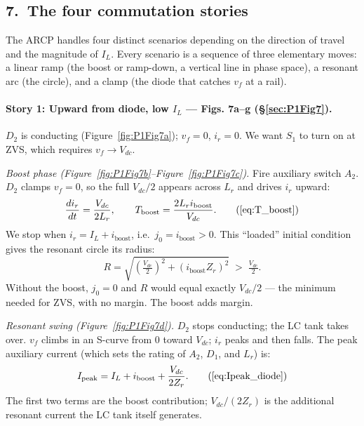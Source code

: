 \documentclass[12pt, a4paper]{article}
\def\,{ }%
\newcommand{\Vdc}{V_{dc}}
\newcommand{\vf}{v_f}
\newcommand{\ir}{i_r}
\newcommand{\IL}{I_L}
\newcommand{\Lr}{L_r}
\newcommand{\Zr}{Z_r}
\newcommand{\figref}[1]{Figure~\ref{#1}}
\begin{document}
\subsection*{7.\ The four commutation stories}

The ARCP handles four distinct scenarios depending on the direction of travel
and the magnitude of $\IL$.
Every scenario is a sequence of three elementary moves: a linear ramp (the
boost or ramp-down, a vertical line in phase space), a resonant arc (the
circle), and a clamp (the diode that catches $\vf$ at a rail).

%
\paragraph{Story 1: Upward from diode, low $\IL$ --- Figs.\,7a--g
           (\S\ref{sec:P1Fig7}).}

$D_2$ is conducting (\figref{fig:P1Fig7a}); $\vf = 0$, $\ir = 0$.
We want $S_1$ to turn on at ZVS, which requires $\vf \to \Vdc$.

\medskip\noindent
\textit{Boost phase (\figref{fig:P1Fig7b}--\figref{fig:P1Fig7c}).}
Fire auxiliary switch $A_2$.
$D_2$ clamps $\vf = 0$, so the full $\Vdc/2$ appears across $\Lr$ and drives
$\ir$ upward:
\begin{equation}
    \frac{d\ir}{dt} = \frac{\Vdc}{2\Lr},
    \qquad
    T_\text{boost} = \frac{2\Lr\,i_\text{boost}}{\Vdc}.
    \tag{\ref{eq:T_boost}}
\end{equation}
We stop when $\ir = \IL + i_\text{boost}$, i.e.\ $j_0 = i_\text{boost} > 0$.
This ``loaded'' initial condition gives the resonant circle its radius:
\[
    R = \sqrt{\!\left(\tfrac{\Vdc}{2}\right)^{\!2} + (i_\text{boost}\Zr)^2}
    \;>\; \tfrac{\Vdc}{2}.
\]
Without the boost, $j_0 = 0$ and $R$ would equal exactly $\Vdc/2$ --- the
minimum needed for ZVS, with no margin.
The boost adds margin.

\medskip\noindent
\textit{Resonant swing (\figref{fig:P1Fig7d}).}
$D_2$ stops conducting; the LC tank takes over.
$\vf$ climbs in an S-curve from 0 toward $\Vdc$; $\ir$ peaks and then falls.
The peak auxiliary current (which sets the rating of $A_2$, $D_1$, and $\Lr$)
is:
\begin{equation}
    I_\text{peak} = \IL + i_\text{boost} + \frac{\Vdc}{2\Zr}.
    \tag{\ref{eq:Ipeak_diode}}
\end{equation}
The first two terms are the boost contribution; $\Vdc/(2\Zr)$ is the
additional resonant current the LC tank itself generates.
\end{document}
